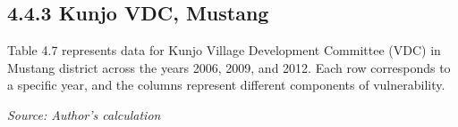 \subsection*{4.4.3 Kunjo VDC, Mustang}
Table 4.7 represents data for Kunjo Village Development Committee (VDC) in Mustang district across the years 2006, 2009, and 2012. Each row corresponds to a specific year, and the columns represent different components of vulnerability.
\begin{table}[ht]
	\captionsetup{labelformat=empty}
	\caption{Table 4.7: Mean of the HVI components for Kunjo VDC, Mustang}
	\label{tab:hvikunjocomponents}
	\textit{Source: Author's calculation}
\end{table}
